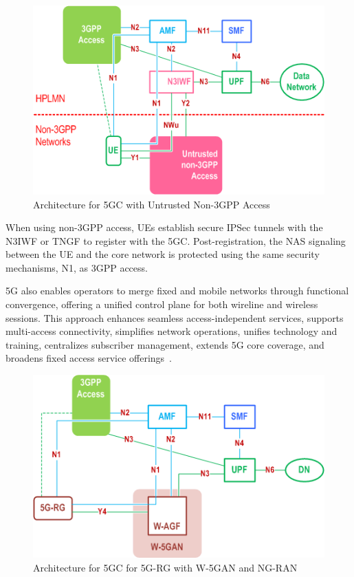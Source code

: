 \begin{figure}
    \centering
    \includegraphics[width=0.5\linewidth]{figs/architecture-for-5g-core-network-with-untrusted-non-3gpp-access.png}
    \caption{Architecture for \acs{5GC} with Untrusted Non-\acs{3GPP} Access}
    \label{fig:architecture-for-5g-core-network-with-untrusted-non-3gpp-access}
\end{figure}

When using non-\ac{3GPP} access, \ac{UE}s establish secure \ac{IPSec} tunnels with the \ac{N3IWF} or \ac{TNGF} to register with the \ac{5GC}. Post-registration, the \ac{NAS} signaling between the \ac{UE} and the core network is protected using the same security mechanisms, N1, as \ac{3GPP} access.

\ac{5G} also enables operators to merge fixed and mobile networks through functional convergence, offering a unified control plane for both wireline and wireless sessions. This approach enhances seamless access-independent services, supports multi-access connectivity, simplifies network operations, unifies technology and training, centralizes subscriber management, extends \ac{5G} core coverage, and broadens fixed access service offerings~\cite{bbf-tr-470-p8}.

\begin{figure}
    \centering
    \includegraphics[width=0.5\linewidth]{figs/Architecture for 5G Core Network for 5G-RG with Wireline 5G Access network and NG RAN.png}
    \caption{Architecture for \acs{5GC} for \acs{5G-RG} with \acs{W-5GAN} and \acs{NG-RAN}}
    \label{fig:Architecture for 5G Core Network for 5G-RG with Wireline 5G Access network and NG RAN}
\end{figure}

